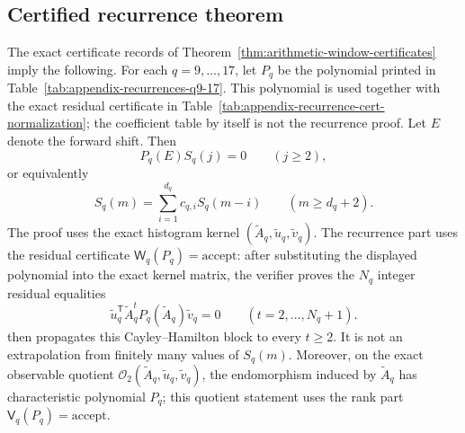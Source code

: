 ﻿\subsection{Certified recurrence theorem}

\begin{theorem}
\label{prop:section7-recurrence-input}
The exact certificate records of
Theorem~\ref{thm:arithmetic-window-certificates} imply the following.  For each
\(q=9,\dots,17\), let
\(P_q\) be the polynomial printed in
Table~\ref{tab:appendix-recurrences-q9-17}.  This polynomial is used together
with the exact residual certificate in
Table~\ref{tab:appendix-recurrence-cert-normalization}; the coefficient table by
itself is not the recurrence proof.  Let \(E\) denote the forward shift.  Then
\[
  P_q(E)S_q(j)=0\qquad(j\ge2),
\]
or equivalently
\[
  S_q(m)=\sum_{i=1}^{d_q}c_{q,i}S_q(m-i)
  \qquad(m\ge d_q+2).
\]
The proof uses the exact histogram kernel
\((\widetilde A_q,\widetilde u_q,\widetilde v_q)\).  The recurrence part uses
the residual certificate \(\mathsf W_q(P_q)=\mathrm{accept}\): after substituting
the displayed polynomial into the exact kernel matrix, the verifier proves the
\(N_q\) integer residual equalities
\[
  \widetilde u_q^{\mathsf T}\widetilde A_q^t
  P_q(\widetilde A_q)\widetilde v_q=0
  \qquad(t=2,\dots,N_q+1).
\]
 then propagates this
Cayley--Hamilton block to every \(t\ge2\).  It is not an extrapolation from
finitely many values of \(S_q(m)\).
Moreover, on the exact observable quotient
\(\mathcal O_2(\widetilde A_q,\widetilde u_q,\widetilde v_q)\), the
endomorphism induced by \(\widetilde A_q\) has characteristic polynomial
\(P_q\); this quotient statement uses the rank part
\(\mathsf V_q(P_q)=\mathrm{accept}\).
\end{theorem}

